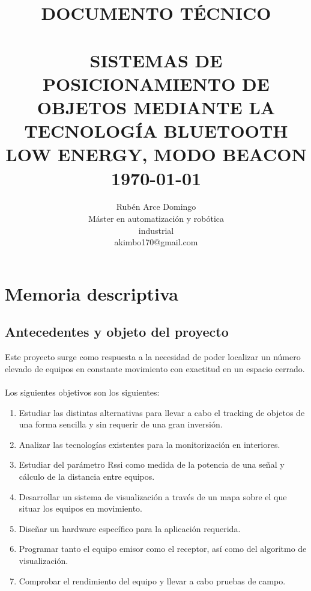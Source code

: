 \documentclass[paper=a4, fontsize=11pt,twoside]{scrartcl}	%
\title{	\normalsize \textsc{DOCUMENTO TÉCNICO} 	%
		 	\\[2.0cm]								%
             \HRule{0.5pt} \\						%
             \LARGE \textbf{\uppercase{Sistemas de posicionamiento de objetos mediante la tecnología Bluetooth Low Energy, modo Beacon}}	%
			\HRule{2pt} \\ [0.5cm]		%
			\normalsize \today			%
		}
\author{
    Rubén Arce Domingo\\	
		Máster en automatización y robótica\\	
        industrial\\
        akimbo170@gmail.com\\
}
\makeatletter
\def\printtitle{%
{\centering \@title\par}}
\def\printauthor{%
{\centering \large \@author}}
\makeatother
\begin{document}
\thispagestyle{empty}		%
\printtitle					%
  	\vfill
\printauthor				%
\newpage


\cleardoublepage
\tableofcontents
\listoffigures
\cleardoublepage
\pagestyle{fancy}




\section{Memoria descriptiva}
    \subsection{Antecedentes y objeto del proyecto}
        Este proyecto surge como respuesta a la necesidad de poder localizar un número elevado de equipos en 
        constante movimiento con exactitud en un espacio cerrado.
        \paragraph{}
       Los siguientes objetivos son los siguientes:
        \begin{enumerate}
            \item Estudiar las distintas alternativas para llevar a cabo el tracking de objetos de una forma
            sencilla y sin requerir de una gran inversión.
            \item Analizar las tecnologías existentes para la monitorización en interiores.
            \item Estudiar del parámetro Rssi como medida de la potencia de una señal y cálculo de la distancia entre equipos.
            \item Desarrollar un sistema de visualización a través de un mapa sobre el que situar los equipos en movimiento.
            \item Diseñar un hardware específico para la aplicación requerida.
            \item Programar tanto el equipo emisor como el receptor, así como del algoritmo de visualización.
            \item Comprobar el rendimiento del equipo y llevar a cabo pruebas de campo. 
        \end{enumerate}
\end{document}
